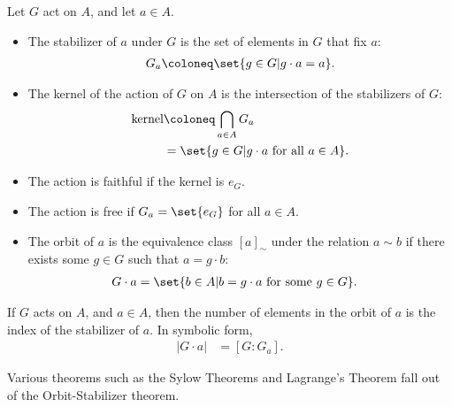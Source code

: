 \begin{definition}
  Let $G$ act on $A$, and let $a\in A$.
  \begin{itemize}
    \item The stabilizer of $a$ under $G$ is the set of elements in $G$ that fix $a$:
      \begin{align*}
        G_{a} \coloneq \set{g\in G | g\cdot a = a}.
      \end{align*}
    \item The kernel of the action of $G$ on $A$ is the intersection of the stabilizers of $G$:
      \begin{align*}
        \text{kernel} &\coloneq \bigcap_{a\in A}G_a\\
                      &= \set{g\in G | g\cdot a\text{ for all }a\in A}.
      \end{align*}
    \item The action is faithful if the kernel is $e_G$.
    \item The action is free if $G_a = \set{e_G}$ for all $a\in A$.
    \item The orbit of $a$ is the equivalence class $\left[a\right]_{\sim}$ under the relation $a\sim b$ if there exists some $g\in G$ such that $a = g\cdot b$:
      \begin{align*}
        G\cdot a &= \set{b\in A | b = g\cdot a\text{ for some }g\in G}.
      \end{align*}
  \end{itemize}
\end{definition}
\begin{theorem}
  If $G$ acts on $A$, and $a\in A$, then the number of elements in the orbit of $a$ is the index of the stabilizer of $a$. In symbolic form,
  \begin{align*}
    \left\vert G\cdot a \right\vert &= \left[G:G_a\right].
  \end{align*}
\end{theorem}
\begin{remark}
  Various theorems such as the Sylow Theorems and Lagrange's Theorem fall out of the Orbit-Stabilizer theorem.
\end{remark}
